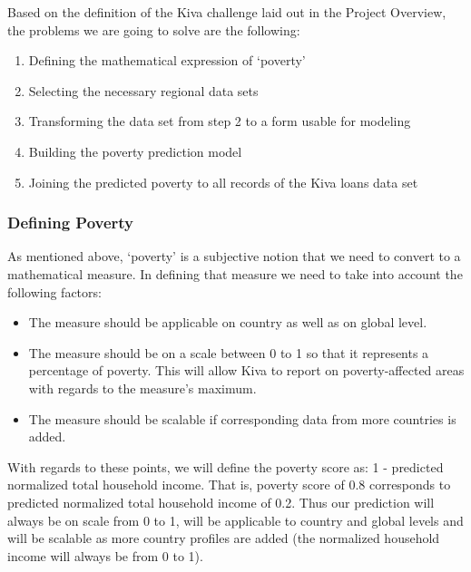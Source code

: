 \documentclass{article}
\begin{document}
Based on the definition of the Kiva challenge laid out in the Project Overview, the problems we are going to solve are the following:
\begin{enumerate}
  \item Defining the mathematical expression of ‘poverty’
  \item Selecting the necessary regional data sets
  \item Transforming the data set from step 2 to a form usable for modeling
  \item Building the poverty prediction model
  \item Joining the predicted poverty to all records of the Kiva loans data set
\end{enumerate}
\subsubsection{Defining Poverty}
As mentioned above, ‘poverty’ is a subjective notion that we need to convert to a mathematical measure. In defining that measure we need to take into account the following factors:
\begin{itemize}
  \item The measure should be applicable on country as well as on global level.
  \item The measure should be on a scale between 0 to 1 so that it represents a percentage of poverty. This will allow Kiva to report on poverty-affected areas with regards to the measure’s maximum.
  \item The measure should be scalable if corresponding data from more countries is added.
\end{itemize}
With regards to these points, we will define the poverty score as: 1 - predicted normalized total household income. That is, poverty score of 0.8 corresponds to predicted normalized total household income of 0.2. Thus our prediction will always be on scale from 0 to 1, will be applicable to country and global levels and will be scalable as more country profiles are added (the normalized household income will always be from 0 to 1).
\end{document}
